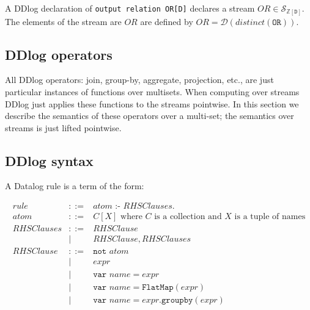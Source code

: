 \documentclass[10pt]{article}
\newcommand{\Z}{\mathbb{Z}}
\newcommand{\stream}[1]{\ensuremath{\mathcal{S}_{#1}}}
\newcommand{\code}[1]{\texttt{#1}}
\newcommand{\D}{\mathcal{D}}
\newcommand{\distinct}{\mathit{distinct}}
\begin{document}

A DDlog declaration of \code{output relation OR[D]} declares a stream
$OR \in \stream{\Z[\code{D}]}$.  The elements of the stream are $OR$ are defined
by $OR = \D(\distinct(\code{OR}))$.

\subsection{DDlog operators}

All DDlog operators: join, group-by, aggregate, projection, etc., are
just particular instances of functions over multisets.  When computing
over streams DDlog just applies these functions to the streams
pointwise.  In this section we describe the semantics of these
operators over a multi-set; the semantics over streams is just lifted
pointwise.

\subsection{DDlog syntax}

A Datalog rule is a term of the form:

\begin{eqnarray*}
  rule &::=& atom \code{ :- } \mathit{RHSClauses}. \\
  atom &::=& C[X] \mbox{ where $C$ is a collection and $X$ is a tuple
    of names} \\
  \mathit{RHSClauses} &::=& \mathit{RHSClause} \\
  &|& \mathit{RHSClause}, \mathit{RHSClauses} \\
  \mathit{RHSClause} &::=& \code{not } atom \\
  &|& expr   \\
  &|& \code{var } name = expr \\
  &|& \code{var } name = \code{FlatMap}( expr ) \\
  &|& \code{var } name = expr \code{.groupby}( expr ) \\
\end{eqnarray*}
\end{document}
